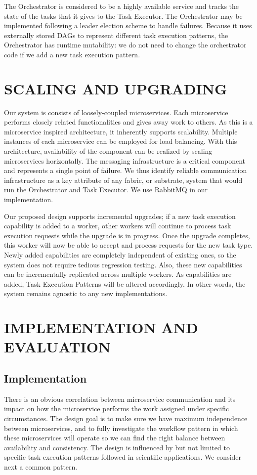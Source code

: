 \documentclass[review]{elsarticle}
\begin{document}
The Orchestrator is considered to be a highly available service and tracks the state of the tasks that it gives to the Task Executor.  The Orchestrator may be implemented following a leader election scheme to handle failures.  Because it uses externally stored DAGs to represent different task execution patterns, the Orchestrator has runtime mutability: we do not need to change the orchestrator code if we add a new task execution pattern. 

\section{SCALING AND UPGRADING}

Our system is consists of loosely-coupled microservices. Each microservice performs closely related functionalities and gives away work to others. As this is a microservice inspired architecture, it inherently supports scalability. Multiple instances of each microservice can be employed for load balancing. With this architecture, availability of the component can be realized by scaling microservices horizontally. The messaging infrastructure is a critical component and represents a single point of failure. We thus identify reliable communication infrastructure as a key attribute of any fabric, or substrate, system that would run the Orchestrator and Task Executor. We use RabbitMQ in our implementation. 

Our proposed design supports incremental upgrades; if a new task execution capability is added to a worker, other workers will continue to process task execution requests while the upgrade is in progress. Once the upgrade completes, this worker will now be able to accept and process requests for the new task type. Newly added capabilities are completely independent of existing ones, so the system does not require tedious regression testing. Also, these new capabilities can be incrementally replicated across multiple workers. As capabilities are added, Task Execution Patterns will be altered accordingly.  In other words, the system remains agnostic to any new implementations.

\section{IMPLEMENTATION AND EVALUATION}

\subsection{Implementation}
There is an obvious correlation between microservice communication and its impact on how the microservice performs the work assigned under specific circumstances. The design goal is to make sure we have maximum independence between microservices, and to fully investigate the workflow pattern in which these microservices will operate so we can find the right balance between availability and consistency.
The design is influenced by but not limited to specific task execution patterns followed in scientific applications.   We consider next a common pattern. 
\end{document}
